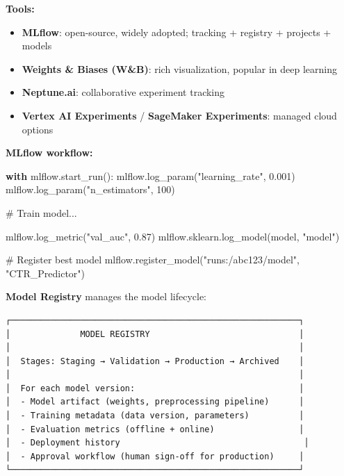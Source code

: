 \documentclass[11pt]{article}
\providecommand{\tightlist}{\setlength{\itemsep}{1pt}\setlength{\parskip}{0pt}}
\newenvironment{Shaded}{\begin{snugshade}}{\end{snugshade}}
\newcommand{\CommentTok}[1]{\textcolor[rgb]{0.48,0.49,0.49}{#1}}
\newcommand{\ControlFlowTok}[1]{\textcolor[rgb]{0.99,0.74,0.29}{\textbf{#1}}}
\newcommand{\DecValTok}[1]{\textcolor[rgb]{0.96,0.45,0.00}{#1}}
\newcommand{\FloatTok}[1]{\textcolor[rgb]{0.96,0.45,0.00}{#1}}
\newcommand{\NormalTok}[1]{\textcolor[rgb]{0.81,0.81,0.76}{#1}}
\newcommand{\StringTok}[1]{\textcolor[rgb]{0.96,0.31,0.31}{#1}}
\begin{document}
\textbf{Tools:}

\begin{itemize}
\tightlist
\item
  \textbf{MLflow}: open-source, widely adopted; tracking + registry + projects + models
\item
  \textbf{Weights \& Biases (W\&B)}: rich visualization, popular in deep learning
\item
  \textbf{Neptune.ai}: collaborative experiment tracking
\item
  \textbf{Vertex AI Experiments} / \textbf{SageMaker Experiments}: managed cloud options
\end{itemize}

\textbf{MLflow workflow:}


\begin{Shaded}
\begin{Highlighting}[]
\ControlFlowTok{with}\NormalTok{ mlflow.start\_run():}
\NormalTok{    mlflow.log\_param(}\StringTok{"learning\_rate"}\NormalTok{, }\FloatTok{0.001}\NormalTok{)}
\NormalTok{    mlflow.log\_param(}\StringTok{"n\_estimators"}\NormalTok{, }\DecValTok{100}\NormalTok{)}
    
    \CommentTok{\# Train model...}
    
\NormalTok{    mlflow.log\_metric(}\StringTok{"val\_auc"}\NormalTok{, }\FloatTok{0.87}\NormalTok{)}
\NormalTok{    mlflow.sklearn.log\_model(model, }\StringTok{"model"}\NormalTok{)}
    
\CommentTok{\# Register best model}
\NormalTok{mlflow.register\_model(}\StringTok{"runs:/abc123/model"}\NormalTok{, }\StringTok{"CTR\_Predictor"}\NormalTok{)}
\end{Highlighting}
\end{Shaded}

\textbf{Model Registry} manages the model lifecycle:

\setcodelang{}

\begin{verbatim}
┌──────────────────────────────────────────────────────────┐
│              MODEL REGISTRY                              │
│                                                          │
│  Stages: Staging → Validation → Production → Archived    │
│                                                          │
│  For each model version:                                 │
│  - Model artifact (weights, preprocessing pipeline)      │
│  - Training metadata (data version, parameters)          │
│  - Evaluation metrics (offline + online)                 │
│  - Deployment history                                     │
│  - Approval workflow (human sign-off for production)     │
└──────────────────────────────────────────────────────────┘
\end{verbatim}
\end{document}
